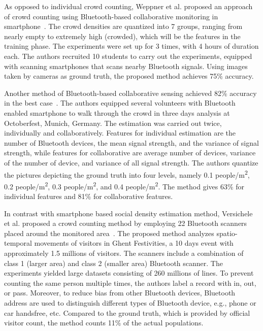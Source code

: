 	As opposed to individual crowd counting, Weppner et al. proposed an approach of crowd counting using Bluetooth-based collaborative monitoring in smartphone~\cite{thesis008}. The crowd densities are quantized into 7 groups, ranging from nearly empty to extremely high (crowded), which will be the features in the training phase. The experiments were set up for 3 times, with 4 hours of duration each. The authors recruited 10 students to carry out the experiments, equipped with scanning smartphones that scans nearby Bluetooth signals. Using images taken by cameras as ground truth, the proposed method achieves 75\% accuracy.

	Another method of Bluetooth-based collaborative sensing achieved 82\% accuracy in the best case~\cite{thesis041}. The authors equipped several volunteers with Bluetooth enabled smartphone to walk through the crowd in three days analysis at Octoberfest, Munich, Germany. The estimation was carried out twice, individually and collaboratively. Features for individual estimation are the number of Bluetooth devices, the mean signal strength, and the variance of signal strength, while features for collaborative are average number of devices, variance of the number of device, and variance of all signal strength. The authors quantize the pictures depicting the ground truth into four levels, namely 0.1 people/m\textsuperscript{2}, 0.2 people/m\textsuperscript{2}, 0.3 people/m\textsuperscript{2}, and 0.4 people/m\textsuperscript{2}. The method gives 63\% for individual features and 81\% for collaborative features.

	In contrast with smartphone based social density estimation method, Versichele et al. proposed a crowd counting method by employing 22 Bluetooth scanners placed around the monitored area~\cite{thesis016}. The proposed method analyzes spatio-temporal movements of visitors in Ghent Festivities, a 10 days event with approximately 1.5 millions of visitors. The scanners include a combination of class 1 (larger area) and class 2 (smaller area) Bluetooth scanner. The experiments yielded large datasets consisting of 260 millions of lines. To prevent counting the same person multiple times, the authors label a record with in, out, or pass. Moreover, to reduce bias from other Bluetooth devices, Bluetooth address are used to distinguish different types of Bluetooth device, e.g., phone or car handsfree, etc. Compared to the ground truth, which is provided by official visitor count, the method counts 11\% of the actual populations.
	


